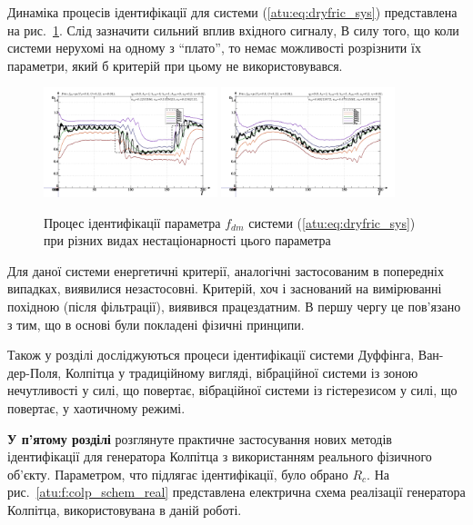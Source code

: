 \documentclass[a4paper,13pt]{atuaref}
\begin{document}
Динаміка процесів ідентифікації для системи (\ref{atu:eq:dryfric_sys})
представлена на рис.~\ref{atu:f:fric_id}. Слід зазначити
сильний вплив вхідного сигналу, В силу того, що коли системи нерухомі на одному
з ``плато'', то немає можливості розрізнити їх параметри, який б критерій при
цьому не використовувався.

\begin{figure}[htb!]
\centerline{
  \includegraphics[width=0.45\textwidth]{p5/p/cha/fric/fric_m5p-pl_n_sign.png}
  \includegraphics[width=0.45\textwidth]{p5/p/cha/fric/fric_m5p-pl_n_sin.png}
}
\caption{
  Процес ідентифікації параметра $ f_{dm} $ системи (\ref{atu:eq:dryfric_sys}) при різних видах нестаціонарності цього параметра
}
\label{atu:f:fric_id}
\end{figure}

Для даної системи енергетичні критерії, аналогічні застосованим в попередніх
випадках, виявилися незастосовні. Критерій, хоч і заснований на вимірюванні
похідною (після фільтрації), виявився працездатним. В першу чергу це пов'язано
з тим, що в основі були покладені фізичні принципи.


Також у розділі досліджуються процеси ідентифікації системи Дуффінга, Ван-дер-Поля,
Колпітца у традиційному вигляді, вібраційної системи
із зоною нечутливості у силі, що повертає, вібраційної системи
із гістерезисом у силі, що повертає, у хаотичному режимі.


\textbf{У п'ятому розділі}
розглянуте практичне застосування
нових методів ідентифікації для генератора Колпітца
з використанням реального фізичного об'єкту.
Параметром, что підлягає ідентифікації, було обрано $R_c$.
На рис.~\ref{atu:f:colp_schem_real} представлена електрична схема реалізації
генератора Колпітца, використовувана в даній роботі.
\end{document}
